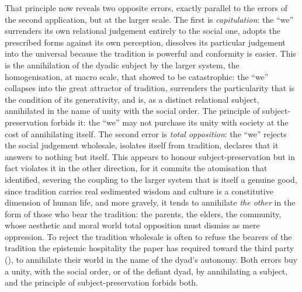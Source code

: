 That principle now reveals two opposite errors, exactly parallel to the errors of the second application, but at the larger scale. The first is \emph{capitulation}: the ``we'' surrenders its own relational judgement entirely to the social one, adopts the prescribed forms against its own perception, dissolves its particular judgement into the universal because the tradition is powerful and conformity is easier. This is the annihilation of the dyadic subject by the larger system, the homogenisation, at macro scale, that  showed to be catastrophic: the ``we'' collapses into the great attractor of tradition, surrenders the particularity that is the condition of its generativity, and is, as a distinct relational subject, annihilated in the name of unity with the social order. The principle of subject-preservation forbids it: the ``we'' may not purchase its unity with society at the cost of annihilating itself. The second error is \emph{total opposition}: the ``we'' rejects the social judgement wholesale, isolates itself from tradition, declares that it answers to nothing but itself. This appears to honour subject-preservation but in fact violates it in the other direction, for it commits the atomisation that  identified, severing the coupling to the larger system that is itself a genuine good, since tradition carries real sedimented wisdom and culture is a constitutive dimension of human life, and more gravely, it tends to annihilate \emph{the other} in the form of those who bear the tradition: the parents, the elders, the community, whose aesthetic and moral world total opposition must dismiss as mere oppression. To reject the tradition wholesale is often to refuse the bearers of the tradition the epistemic hospitality the paper has required toward the third party (), to annihilate their world in the name of the dyad's autonomy. Both errors buy a unity, with the social order, or of the defiant dyad, by annihilating a subject, and the principle of subject-preservation forbids both.

